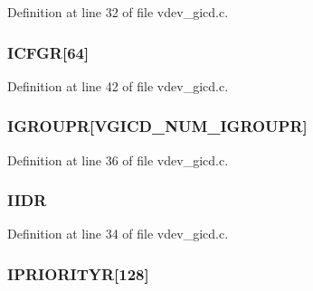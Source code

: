 \-Definition at line 32 of file vdev\-\_\-gicd.\-c.

\hypertarget{structgicd__regs_a01a6b9929552e51bbeabe8dd8311db8f}{
\subsubsection[{\-I\-C\-F\-G\-R}]{ {\bf \-I\-C\-F\-G\-R}\mbox{[}64\mbox{]}}}\label{structgicd__regs_a01a6b9929552e51bbeabe8dd8311db8f}


\-Definition at line 42 of file vdev\-\_\-gicd.\-c.

\hypertarget{structgicd__regs_aa0ebbe1fac9ce77096bd5d05bb31aa4a}{
\subsubsection[{\-I\-G\-R\-O\-U\-P\-R}]{ {\bf \-I\-G\-R\-O\-U\-P\-R}\mbox{[}{\bf \-V\-G\-I\-C\-D\-\_\-\-N\-U\-M\-\_\-\-I\-G\-R\-O\-U\-P\-R}\mbox{]}}}\label{structgicd__regs_aa0ebbe1fac9ce77096bd5d05bb31aa4a}


\-Definition at line 36 of file vdev\-\_\-gicd.\-c.

\hypertarget{structgicd__regs_a037d1b98fd054c88ca110e12d406dba7}{
\subsubsection[{\-I\-I\-D\-R}]{ {\bf \-I\-I\-D\-R}}}\label{structgicd__regs_a037d1b98fd054c88ca110e12d406dba7}


\-Definition at line 34 of file vdev\-\_\-gicd.\-c.

\hypertarget{structgicd__regs_a83e872a975dee8c1feb8665d21f9307e}{
\subsubsection[{\-I\-P\-R\-I\-O\-R\-I\-T\-Y\-R}]{ {\bf \-I\-P\-R\-I\-O\-R\-I\-T\-Y\-R}\mbox{[}128\mbox{]}}}\label{structgicd__regs_a83e872a975dee8c1feb8665d21f9307e}


